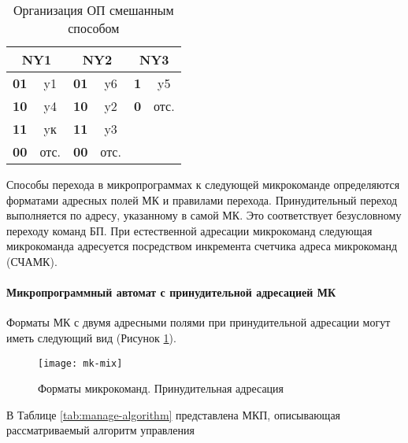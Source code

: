 \documentclass[a4paper,14pt]{extarticle}
\begin{document}
\begin{table}[h!]
		\caption{Организация ОП смешанным способом}
	\centering
		\begin{tabular}{|c|c|c|c|c|c|}
		\hline
		\multicolumn{2}{|c|}{NY1} &  \multicolumn{2}{c|}{NY2} & \multicolumn{2}{c|}{NY3}  \\
		\hline
		\textbf{01} & y1 & \textbf{01} & y6 & \textbf{1} & y5 \\
		\hline
		\textbf{10} & y4 & \textbf{10} & y2 & \textbf{0} & отс. \\
		\hline
		\textbf{11} & yк & \textbf{11} & y3  &  &  \\
		\hline
		\textbf{00} & отс. & \textbf{00} & отс. &  &  \\
		\hline
	\end{tabular}

	\label{tab:op-mix}
\end{table}




Способы перехода в микропрограммах к следующей микрокоманде определяются форматами адресных полей МК и правилами перехода. Принудительный переход выполняется по адресу, указанному в самой МК. Это соответствует безусловному переходу команд БП. При естественной адресации микрокоманд следующая микрокоманда адресуется посредством инкремента счетчика адреса микрокоманд (СЧАМК).

\paragraph{Микропрограммный автомат с принудительной адресацией МК}
Форматы МК с двумя адресными полями при принудительной адресации
могут иметь следующий вид (Рисунок \ref{fig:mk-mix}).

\begin{figure}[h!]
	\centering
	\texttt{[image: mk-mix]}
	\caption{Форматы микрокоманд. Принудительная адресация}
	\label{fig:mk-mix}
\end{figure}

В Таблице \ref{tab:manage-algorithm} представлена МКП, описывающая рассматриваемый алгоритм управления
\end{document}
